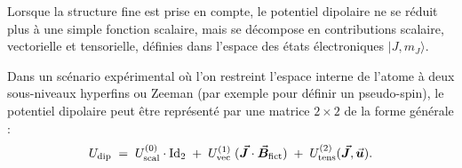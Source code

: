 Lorsque la structure fine est prise en compte, le potentiel dipolaire ne se réduit plus à une simple fonction scalaire, mais se décompose en contributions scalaire, vectorielle et tensorielle, définies dans l’espace des états électroniques $|J,m_J\rangle$. 

\medskip

Dans un scénario expérimental où l’on restreint l’espace interne de l’atome à deux sous-niveaux hyperfins ou Zeeman (par exemple pour définir un pseudo-spin), le potentiel dipolaire peut être représenté par une matrice $2\times 2$ de la forme générale \cite{Le_Kien_2013}:
\begin{eqnarray}
	U_{\mathrm{dip}} \;=\; U_{\mathrm{scal}}^{(0)} \cdot \mbox{Id}_2 
	\;+\; U^{(1)}_{\mathrm{vec}}\;(\vec{{\bm{J}}}\cdot\vec{{\bm{B}}}_{\rm fict})
	\;+\; U^{(2)}_{\mathrm{tens}}(\vec{{\bm{J}}},\vec{{\bm{u}}}).
	\label{eq:dipole-potential-decomposition}
\end{eqnarray}

